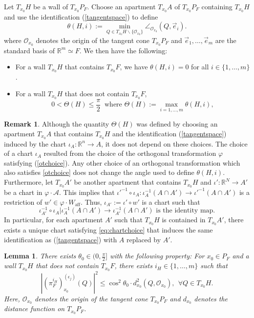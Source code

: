 \documentclass[12pt]{amsart}
\newtheorem{lemma}[theorem]{Lemma}
\theoremstyle{definition}
\newtheorem{remark}[theorem]{Remark}
\numberwithin{equation}{section}
\newcommand{\R}{\mathbb R}
\newcommand{\ee}{{(\epsilon_j)}}
\newcommand{\PF}{P_F}
\begin{document}
Let  $T_{x_0}H$ be a wall  of $T_{x_0}\PF$.  Choose an apartment $T_{x_0}A$ of $T_{x_0}\PF$ containing $T_{x_0}H$ and  use the identification (\ref{tangentspace}) to define
\[
\theta(H,i) :=\min_{Q \in T_{x_0}H \backslash \{{\mathcal O}_{x_0}\}} \angle_{{\mathcal O}_{x_0}}(Q, \vec e_i).
\]
where  $\mathcal O_{x_0}$ denotes the origin of the tangent cone $T_{x_0}\PF$ and $\vec e_1, \dots, \vec e_m$ are the standard basis of $\R^m \simeq F$.  We then have the following:
\begin{itemize}
\item For a wall $T_{x_0}H$ that contains $T_{x_0}F$, we have $\theta(H,i)=0$ for all $i \in \{1, \dots, m\}$.  
\item For a wall $T_{x_0}H$ that does not contain $T_{x_0}F$,
\[
0 < \Theta(H) \leq \frac{\pi}{2}  \ \mbox{ where } \Theta(H):= \max_{i=1, \dots, m}  \theta(H,i),
\]
\end{itemize}
\begin{remark}\label{rem:thetanot}
Although the quantity $\Theta(H)$ was defined by choosing an apartment $T_{x_0}A$ that contains $T_{x_0}H$ and the identification (\ref{tangentspace}) induced by the chart $\iota_A:\R^n \to A$, it  does not depend on these choices.  The choice of a chart  $\iota_A$ resulted from the choice of the orthogonal transformation $\varphi$ satisfying (\ref{otchoice}).  Any other choice of an orthogonal transformation which also satisfies \eqref{otchoice} does not change the angle used to define $\theta(H,i)$.  Furthermore,  let $T_{x_0}A'$ be another apartment that contains $T_{x_0}H$ and $\iota':\R^N \rightarrow A'$ be a chart in $\varphi \cdot \mathcal A$. This implies that $\iota'^{-1} \circ \iota_A:\iota_A^{-1}(A \cap A') \to \iota'^{-1}(A \cap A')$ is a restriction of $w' \in \varphi \cdot W_{\mathrm{aff}}$.  Thus, $\iota_{A'}:=\iota' \circ w'$ is a chart such that 
 \begin{equation}\label{eq:chartchoice}
\iota_{A'}^{-1} \circ \iota_A|\iota_A^{-1}(A \cap A') \to \iota_{A'}^{-1}(A \cap A')\text{ is the identity map.}
\end{equation}
In particular, for each apartment $A'$ such that $T_{x_0}H$ is contained in $T_{x_0}A'$, there exists a unique chart satisfying \eqref{eq:chartchoice} that induces the same identification as (\ref{tangentspace}) with $A$ replaced by $A'$.
  \end{remark}


\begin{lemma} \label{angle}
There exists $\theta_0 \in (0,\frac{\pi}{2}]$ with the following property:  For $x_0 \in \PF$ and   a wall  $T_{x_0}H$ that does not contain $T_{x_0}F$,   there exists $i_H\in \{1,\dots, m\}$ such that
$$
 |(\pi_{F}^{i_H})_{x_0}^\ee (Q) |^2 \leq \cos^2 \theta_0 \cdot d^2_{ x_0}(Q,\mathcal O_{x_0}), \ \ \forall Q \in T_{x_0}H.
$$
Here,  $\mathcal O_{x_0}$ denotes the origin of the tangent cone $T_{x_0}\PF$ and $d_{x_0}$ denotes the distance function on $T_{x_0}\PF$.
\end{lemma}
\end{document}
